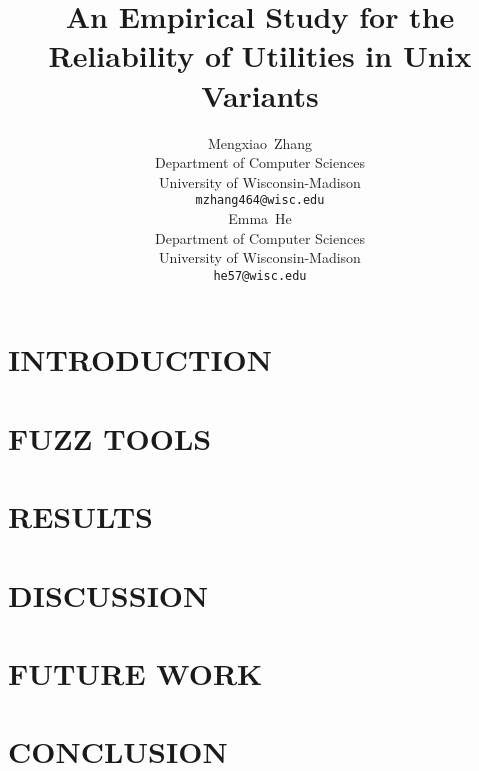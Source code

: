 \documentclass{article}
\title{An Empirical Study for the Reliability of Utilities in Unix Variants}
\author{
  Mengxiao~Zhang \\
  Department of Computer Sciences \\
  University of Wisconsin-Madison \\
  \texttt{mzhang464@wisc.edu} \\
   \And
  Emma~He \\
  Department of Computer Sciences \\
  University of Wisconsin-Madison \\
  \texttt{he57@wisc.edu} \\
}
\begin{document}
\maketitle


\begin{abstract}

\end{abstract}





\section{INTRODUCTION}
\label{sec:introduction}


\section{FUZZ TOOLS}
\label{sec:fuzz tools}


\section{RESULTS}
\label{sec:results}


\section{DISCUSSION}
\label{sec:discussion}


\section{FUTURE WORK}
\label{sec:future}


\section{CONCLUSION}
\label{sec:conclusion}




\end{document}
